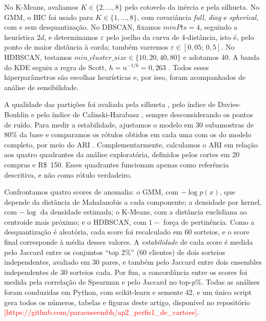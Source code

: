 \documentclass[12pt]{article}
\newcommand{\repo}{\textcolor{red}{[https://github.com/paraenseembh/ap2\_perfis1\_de\_cartoes]}}\renewcommand{\tabularxcolumn}[1]{m{#1}}
\begin{document}
No K-Means, avaliamos $K\in\{2,\dots,8\}$ pelo cotovelo da inércia e pela silhueta. No GMM, o BIC
\cite{schwarz1978bic} foi usado para $K\in\{1,\dots,8\}$, com covariância \emph{full}, \emph{diag} e
\emph{spherical}, com e sem desquantização. No DBSCAN, fixamos $\textit{minPts}=4$, seguindo a heurística
$2d$, e determinamos $\varepsilon$ pelo joelho da curva de 4-distância, isto é, pelo ponto de maior
distância à corda; também varremos $\varepsilon\in[0{,}05;\,0{,}5]$. No HDBSCAN, testamos
$\textit{min\_cluster\_size}\in\{10,20,40,80\}$ e adotamos 40. A banda do KDE seguiu a regra de Scott,
$h=n^{-1/6}=0{,}263$ \cite{scott1992density}. Todos esses hiperparâmetros são escolhas heurísticas e,
por isso, foram acompanhados de análise de sensibilidade.

A qualidade das partições foi avaliada pela silhueta \cite{rousseeuw1987silhouette}, pelo índice de
Davies-Bouldin \cite{davies1979index} e pelo índice de Calinski-Harabasz \cite{calinski1974index}, sempre
desconsiderando os pontos de ruído. Para medir a estabilidade, ajustamos o modelo em 30 subamostras de
80\% da base e comparamos os rótulos obtidos em cada uma com os do modelo completo, por meio do ARI
\cite{hubert1985ari}. Complementarmente, calculamos o ARI em relação aos quatro quadrantes da análise
exploratória, definidos pelos cortes em 20 compras e R\$~150. Esses quadrantes funcionam apenas como
referência descritiva, e não como rótulo verdadeiro.

Confrontamos quatro scores de anomalia: o GMM, com $-\log p(x)$, que depende da distância de Mahalanobis a
cada componente; a densidade por kernel, com $-\log$ da densidade estimada; o K-Means, com a distância
euclidiana ao centroide mais próximo; e o HDBSCAN, com $1-$ força de pertinência. Como a desquantização é
aleatória, cada score foi recalculado em 60 sorteios, e o score final corresponde à média desses valores. A
\emph{estabilidade} de cada score é medida pelo Jaccard entre os conjuntos ``top 2\%'' (60 clientes) de dois
sorteios independentes, avaliado em 30 pares, e também pelo Jaccard entre dois ensembles independentes de 30
sorteios cada. Por fim, a concordância entre os scores foi medida pela correlação de Spearman e pelo Jaccard
no top-$p$\%. Todas as análises foram conduzidas em Python, com scikit-learn \cite{pedregosa2011sklearn} e
semente 42, e um único script gera todos os números, tabelas e figuras deste artigo, disponível no
repositório \repo.

\end{document}
